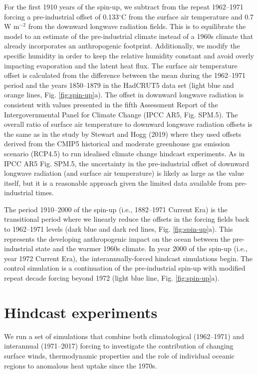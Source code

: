 \documentclass{nature}
\begin{document}
\begin{methods}
		For the first 1910 years of the spin-up, we subtract from the repeat 1962--1971 forcing a pre-industrial offset of 0.133$^{\circ}$C from the surface air temperature and 0.7 W m$^{-2}$ from the downward longwave radiation fields. This is to equilibrate the model to an estimate of the pre-industrial climate instead of a 1960s climate that already incorporates an anthropogenic footprint. Additionally, we modify the specific humidity in order to keep the relative humidity constant and avoid overly impacting evaporation and the latent heat flux. The surface air temperature offset is calculated from the difference between the mean during the 1962--1971 period and the years 1850--1879 in the HadCRUT5\cite{morice2021hadcrut_updated} data set (light blue and orange lines, Fig. \ref{fig:spin-up}a). The offset in downward longwave radiation is consistent with values presented in the fifth Assessment Report of the Intergovernmental Panel for Climate Change (IPCC AR5, Fig. SPM.5)\cite{IPCCAR5SPM}. The overall ratio of surface air temperature to downward longwave radiation offsets is the same as in the study by Stewart and Hogg (2019)\cite{stewart2019southern} where they used offsets derived from the CMIP5 historical and moderate greenhouse gas emission scenario (RCP4.5) to run idealised climate change hindcast experiments. As in IPCC AR5 Fig. SPM.5\cite{IPCCAR5SPM}, the uncertainty in the pre-industrial offset of downward longwave radiation (and surface air temperature) is likely as large as the value itself, but it is a reasonable approach given the limited data available from pre-industrial times. 
		
		The period 1910--2000 of the spin-up (i.e., 1882--1971 Current Era) is the transitional period where we linearly reduce the offsets in the forcing fields back to 1962--1971 levels (dark blue and dark red lines, Fig. \ref{fig:spin-up}a). This represents the developing anthropogenic impact on the ocean between the pre-industrial state and the warmer 1960s climate. In year 2000 of the spin-up (i.e., year 1972 Current Era), the interannually-forced hindcast simulations begin. The control simulation is a continuation of the pre-industrial spin-up with modified repeat decade forcing beyond 1972 (light blue line, Fig. \ref{fig:spin-up}a).
		
		\section*{Hindcast experiments}
		We run a set of simulations that combine both climatological (1962--1971) and interannual (1971--2017) forcing to investigate the contribution of changing surface winds, thermodynamic properties and the role of individual oceanic regions to anomalous heat uptake since the 1970s.
		

\end{methods}
\end{document}
